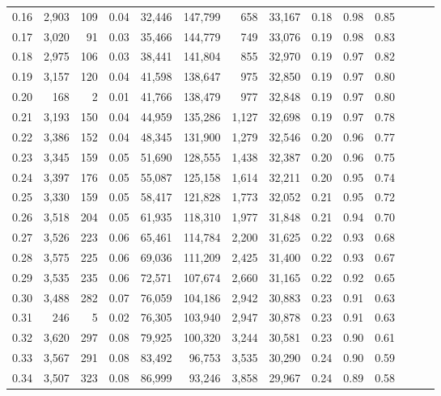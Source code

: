 \begin{tabular}{rrrrrrrrrrrrrr}
0.16 &  2,903 &  109 &  0.04 &   32,446 &  147,799 &     658 &  33,167 &  0.18 &  0.98 &      0.85 \\
0.17 &  3,020 &   91 &  0.03 &   35,466 &  144,779 &     749 &  33,076 &  0.19 &  0.98 &      0.83 \\
0.18 &  2,975 &  106 &  0.03 &   38,441 &  141,804 &     855 &  32,970 &  0.19 &  0.97 &      0.82 \\
0.19 &  3,157 &  120 &  0.04 &   41,598 &  138,647 &     975 &  32,850 &  0.19 &  0.97 &      0.80 \\
0.20 &    168 &    2 &  0.01 &   41,766 &  138,479 &     977 &  32,848 &  0.19 &  0.97 &      0.80 \\
0.21 &  3,193 &  150 &  0.04 &   44,959 &  135,286 &   1,127 &  32,698 &  0.19 &  0.97 &      0.78 \\
0.22 &  3,386 &  152 &  0.04 &   48,345 &  131,900 &   1,279 &  32,546 &  0.20 &  0.96 &      0.77 \\
0.23 &  3,345 &  159 &  0.05 &   51,690 &  128,555 &   1,438 &  32,387 &  0.20 &  0.96 &      0.75 \\
0.24 &  3,397 &  176 &  0.05 &   55,087 &  125,158 &   1,614 &  32,211 &  0.20 &  0.95 &      0.74 \\
0.25 &  3,330 &  159 &  0.05 &   58,417 &  121,828 &   1,773 &  32,052 &  0.21 &  0.95 &      0.72 \\
0.26 &  3,518 &  204 &  0.05 &   61,935 &  118,310 &   1,977 &  31,848 &  0.21 &  0.94 &      0.70 \\
0.27 &  3,526 &  223 &  0.06 &   65,461 &  114,784 &   2,200 &  31,625 &  0.22 &  0.93 &      0.68 \\
0.28 &  3,575 &  225 &  0.06 &   69,036 &  111,209 &   2,425 &  31,400 &  0.22 &  0.93 &      0.67 \\
0.29 &  3,535 &  235 &  0.06 &   72,571 &  107,674 &   2,660 &  31,165 &  0.22 &  0.92 &      0.65 \\
0.30 &  3,488 &  282 &  0.07 &   76,059 &  104,186 &   2,942 &  30,883 &  0.23 &  0.91 &      0.63 \\
0.31 &    246 &    5 &  0.02 &   76,305 &  103,940 &   2,947 &  30,878 &  0.23 &  0.91 &      0.63 \\
0.32 &  3,620 &  297 &  0.08 &   79,925 &  100,320 &   3,244 &  30,581 &  0.23 &  0.90 &      0.61 \\
0.33 &  3,567 &  291 &  0.08 &   83,492 &   96,753 &   3,535 &  30,290 &  0.24 &  0.90 &      0.59 \\
0.34 &  3,507 &  323 &  0.08 &   86,999 &   93,246 &   3,858 &  29,967 &  0.24 &  0.89 &      0.58 \\

\end{tabular}
